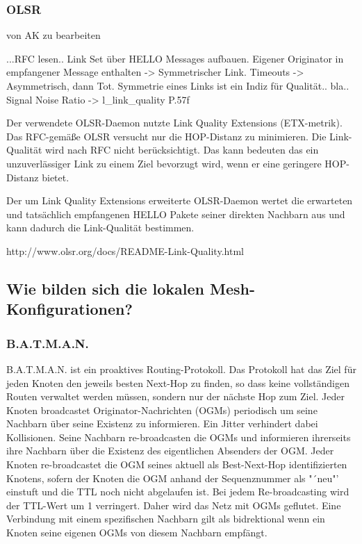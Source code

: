 \documentclass[a4paper,10pt]{article}
\begin{document}

\subsubsection*{OLSR}

von AK zu bearbeiten

...RFC lesen..
Link Set über HELLO Messages aufbauen. Eigener Originator in 
empfangener Message enthalten -> Symmetrischer Link. Timeouts -> Asymmetrisch, dann Tot.
Symmetrie eines Links ist ein Indiz für Qualität.. bla..
Signal Noise Ratio -> l\_link\_quality P.57f

Der verwendete OLSR-Daemon nutzte Link Quality Extensions (ETX-metrik).
Das RFC-gemäße OLSR versucht nur die HOP-Distanz zu minimieren. Die Link-Qualität
wird nach RFC nicht berücksichtigt. Das kann bedeuten das ein unzuverlässiger Link zu einem Ziel bevorzugt wird,
wenn er eine geringere HOP-Distanz bietet.

Der um Link Quality Extensions erweiterte OLSR-Daemon wertet die erwarteten und tatsächlich empfangenen
HELLO Pakete seiner direkten Nachbarn aus und kann dadurch die Link-Qualität bestimmen.

http://www.olsr.org/docs/README-Link-Quality.html


\subsection{Wie bilden sich die lokalen Mesh-Konfigurationen?}


\subsubsection*{B.A.T.M.A.N.}

B.A.T.M.A.N. ist ein proaktives Routing-Protokoll.
Das Protokoll hat das Ziel für jeden Knoten den jeweils besten Next-Hop zu finden, so dass keine vollständigen Routen verwaltet werden müssen, sondern nur der nächste Hop zum Ziel.
Jeder Knoten broadcastet Originator-Nachrichten (OGMs) periodisch um seine Nachbarn über seine Existenz zu informieren.
Ein Jitter verhindert dabei Kollisionen.
Seine Nachbarn re-broadcasten die OGMs und informieren ihrerseits ihre Nachbarn über die Existenz des eigentlichen Absenders der OGM.
Jeder Knoten re-broadcastet die OGM seines aktuell als Best-Next-Hop identifizierten Knotens, sofern der Knoten die OGM anhand der Sequenznummer als "´neu"' einstuft und die TTL noch nicht abgelaufen ist.
Bei jedem Re-broadcasting wird der TTL-Wert um 1 verringert.
Daher wird das Netz mit OGMs geflutet.
Eine Verbindung mit einem spezifischen Nachbarn gilt als bidrektional wenn ein Knoten seine eigenen OGMs von diesem Nachbarn empfängt.
\end{document}
